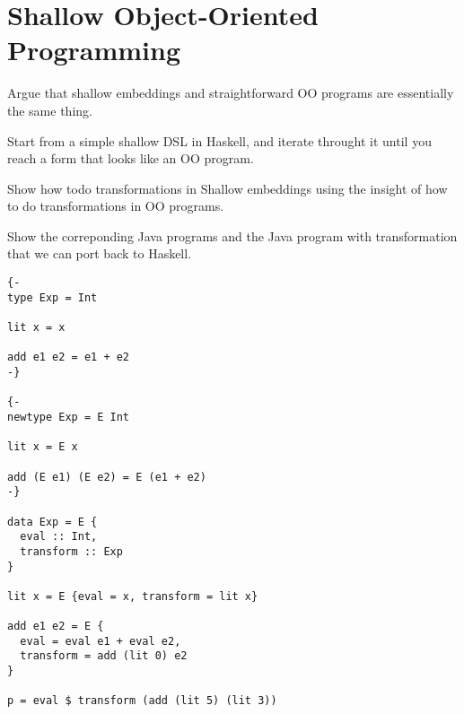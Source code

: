 \section{Shallow Object-Oriented Programming}

Argue that shallow embeddings and straightforward OO 
programs are essentially the same thing. 

Start from a simple shallow DSL in Haskell, 
and iterate throught it until you reach a form 
that looks like an OO program.

Show how todo transformations in Shallow embeddings
using the insight of how to do transformations in OO
programs.

Show the correponding Java programs and the Java program 
with transformation that we can port back to Haskell.

\begin{verbatim}
{-
type Exp = Int

lit x = x

add e1 e2 = e1 + e2
-}

{-
newtype Exp = E Int

lit x = E x

add (E e1) (E e2) = E (e1 + e2)
-}

data Exp = E {
  eval :: Int,
  transform :: Exp
}

lit x = E {eval = x, transform = lit x}

add e1 e2 = E {
  eval = eval e1 + eval e2,
  transform = add (lit 0) e2
}

p = eval $ transform (add (lit 5) (lit 3))
\end{verbatim}
